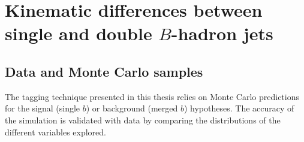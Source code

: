 %
%
\chapter{Kinematic differences between single and double $B$-hadron jets}




\section{Data and Monte Carlo samples}\label{sec:Simulation}


The tagging technique presented in this thesis relies on Monte Carlo predictions for the signal (single $b$) or background (merged $b$) hypotheses. The accuracy of the simulation is validated with data by comparing the distributions of the different variables explored.

